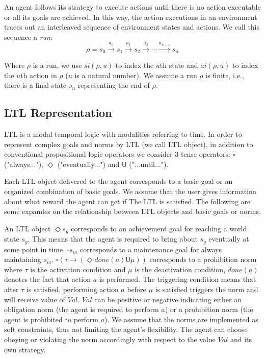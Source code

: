 \documentclass{article}
\begin{document}
An agent follows its strategy to execute actions until there is no action executable or all its goals are achieved. In this way, the action executions in an environment traces out an interleaved sequence of environment states and actions. We call this sequence a \emph{run}:
$$\rho=s_0 \xrightarrow{\text{$a_0$}} s_1 \xrightarrow{\text{$a_1$}} s_2 \xrightarrow{\text{$a_2$}} \cdots \xrightarrow{\text{$a_{n-1}$}} s_n$$

Where $\rho$ is a run, we use $si(\rho, u)$ to index the $u$th state and $ai(\rho, u)$ to index the $u$th action in $\rho$ ($u$ is a natural number). We assume a run $\rho$ is finite, i.e., there is a final state $s_n$ representing the end of $\rho$.

\subsection*{LTL Representation}
LTL is a modal temporal logic with modalities referring to time. In order to represent complex goals and norms by LTL (we call LTL object), in addition to conventional propositional logic operators we consider 3 tense operators: $\square$ ("always..."), $\Diamond$ ("eventually...") and $\mathsf{U}$ ("...until...").

Each LTL object delivered to the agent corresponds to a basic goal or an organized combination of basic goals. We assume that the user gives information about what reward the agent can get if The LTL is satisfied. The following are some expamles on the relationship between LTL objects and basic goals or norms.

%
An LTL object $\Diamond s_g$ corresponds to an achievement goal for reaching a world state $s_g$. This means that the agent is required to bring about $s_g$ eventually at some point in time.
%
$\square s_m$ corresponds to a maintenance goal for always maintaining $s_m$.
%
$\square (\tau \rightarrow ( \Diamond done(a) \mathsf{U} \mu))$ corresponds to a prohibition norm where $\tau$ is the activation condition and $\mu$ is the deactivation condition, $done(a)$ denotes the fact that action $a$ is performed. The triggering condition means that after $\tau$ is satisfied, performing action $a$ before $\mu$ is satisfied triggers the norm and will receive value of $Val$. $Val$ can be positive or negative indicating either an obligation norm (the agent is required to perform $a$) or a prohibition norm (the agent is prohibited to perform $a$). We assume that the norms are implemented as soft constraints, thus not limiting the agent's flexibility. The agent can choose obeying or violating the norm accordingly with respect to the value $Val$ and its own strategy.
\end{document}
